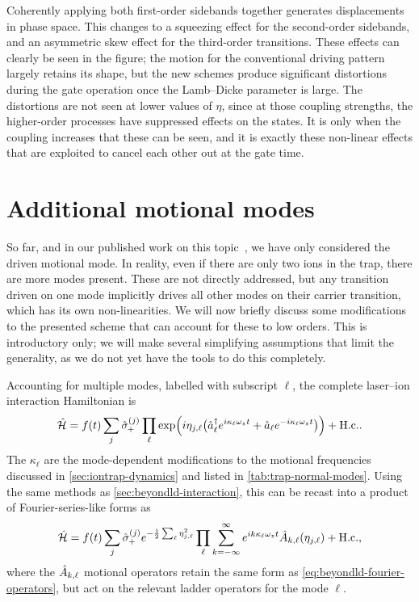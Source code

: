 Coherently applying both first-order sidebands together generates displacements in phase space.
This changes to a squeezing effect for the second-order sidebands, and an asymmetric skew effect for the third-order transitions.
These effects can clearly be seen in the figure; the motion for the conventional driving pattern largely retains its shape, but the new schemes produce significant distortions during the gate operation once the Lamb--Dicke parameter is large.
The distortions are not seen at lower values of $\eta$, since at those coupling strengths, the higher-order processes have suppressed effects on the states.
It is only when the coupling increases that these can be seen, and it is exactly these non-linear effects that are exploited to cancel each other out at the gate time.


\section{Additional motional modes}

So far, and in our published work on this topic~\cite{Sameti2021}, we have only considered the driven motional mode.
In reality, even if there are only two ions in the trap, there are more modes present.
These are not directly addressed, but any transition driven on one mode implicitly drives all other modes on their carrier transition, which has its own non-linearities.
We will now briefly discuss some modifications to the presented scheme that can account for these to low orders.
This is introductory only; we will make several simplifying assumptions that limit the generality, as we do not yet have the tools to do this completely.

Accounting for multiple modes, labelled with subscript $\ell$, the complete laser--ion interaction Hamiltonian is
\begin{equation}
\hat{\mathcal H} = f(t)\sum_j \hat{\sigma}_{\mkern-1mu+}^{(j)}\prod_\ell\exp\Bigl(i\eta_{j,\ell}\bigl(\hat{a}^\dagger_\ell e^{i\kappa_\ell\omega_z t} + \hat{a}_\ell e^{-i\kappa_\ell\omega_z t}\bigr)\Bigr) + \text{H.c.}.
\end{equation}
The $\kappa_\ell$ are the mode-dependent modifications to the motional frequencies discussed in \cref{sec:iontrap-dynamics} and listed in \cref{tab:trap-normal-modes}.
Using the same methods as \cref{sec:beyondld-interaction}, this can be recast into a product of Fourier-series-like forms as
\begin{equation}\label{eq:beyondld-multimode-general-hamiltonian}
\hat{\mathcal H} = f(t)\sum_j \hat{\sigma}_{\mkern-1mu+}^{(j)}e^{-\frac12\sum_\ell \eta_{j,\ell}^2}\prod_\ell\sum_{k=-\infty}^\infty e^{ik\kappa_\ell\omega_z t} \hat{A}_{k,\ell}(\eta_{j,\ell}) + \text{H.c.},
\end{equation}
where the $\hat{A}_{k,\ell}$ motional operators retain the same form as \cref{eq:beyondld-fourier-operators}, but act on the relevant ladder operators for the mode $\ell$.

